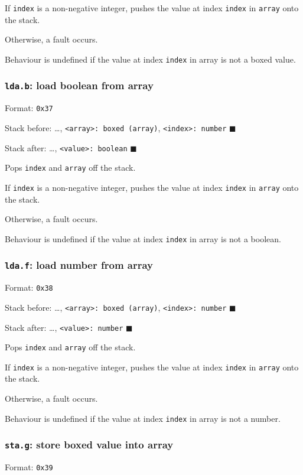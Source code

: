 If \texttt{index} is a non-negative integer, pushes the value at index \texttt{index}
in \texttt{array} onto the stack.

Otherwise, a fault occurs.

Behaviour is undefined if the value at index \texttt{index} in array is not a
boxed value.

\subsubsection{\texttt{lda.b}: load boolean from array}
\label{sec:orgb1de169}
Format: \texttt{0x37}

Stack before: \ldots{}, \texttt{<array>: boxed (array)}, \texttt{<index>: number} \(\blacksquare\)

Stack after: \ldots{}, \texttt{<value>: boolean} \(\blacksquare\)

Pops \texttt{index} and \texttt{array} off the stack.

If \texttt{index} is a non-negative integer, pushes the value at index \texttt{index}
in \texttt{array} onto the stack.

Otherwise, a fault occurs.

Behaviour is undefined if the value at index \texttt{index} in array is not a
boolean.

\subsubsection{\texttt{lda.f}: load number from array}
\label{sec:orgdc8e9a7}
Format: \texttt{0x38}

Stack before: \ldots{}, \texttt{<array>: boxed (array)}, \texttt{<index>: number} \(\blacksquare\)

Stack after: \ldots{}, \texttt{<value>: number} \(\blacksquare\)

Pops \texttt{index} and \texttt{array} off the stack.

If \texttt{index} is a non-negative integer, pushes the value at index \texttt{index}
in \texttt{array} onto the stack.

Otherwise, a fault occurs.

Behaviour is undefined if the value at index \texttt{index} in array is not a
number.

\subsubsection{\texttt{sta.g}: store boxed value into array}
\label{sec:org4724d89}
Format: \texttt{0x39}

